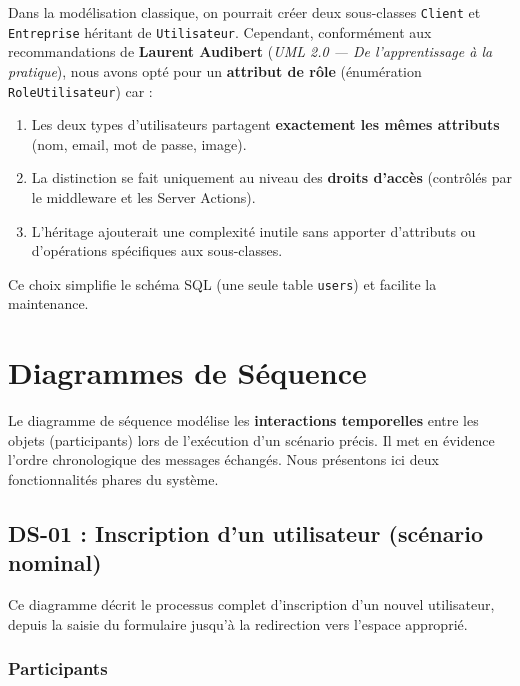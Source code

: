 \documentclass[12pt,a4paper]{article}
\begin{document}
\begin{tcolorbox}[colback=green!3!white,colframe=green!50!black,title=Choix de conception]
Dans la modélisation classique, on pourrait créer deux sous-classes \texttt{Client} et \texttt{Entreprise} héritant de \texttt{Utilisateur}. Cependant, conformément aux recommandations de \textbf{Laurent Audibert} (\textit{UML 2.0 — De l'apprentissage à la pratique}), nous avons opté pour un \textbf{attribut de rôle} (énumération \texttt{RoleUtilisateur}) car :
\begin{enumerate}
    \item Les deux types d'utilisateurs partagent \textbf{exactement les mêmes attributs} (nom, email, mot de passe, image).
    \item La distinction se fait uniquement au niveau des \textbf{droits d'accès} (contrôlés par le middleware et les Server Actions).
    \item L'héritage ajouterait une complexité inutile sans apporter d'attributs ou d'opérations spécifiques aux sous-classes.
\end{enumerate}
Ce choix simplifie le schéma SQL (une seule table \texttt{users}) et facilite la maintenance.
\end{tcolorbox}

\newpage
\section{Diagrammes de Séquence}

Le diagramme de séquence modélise les \textbf{interactions temporelles} entre les objets (participants) lors de l'exécution d'un scénario précis. Il met en évidence l'ordre chronologique des messages échangés. Nous présentons ici deux fonctionnalités phares du système.

\subsection{DS-01 : Inscription d'un utilisateur (scénario nominal)}

Ce diagramme décrit le processus complet d'inscription d'un nouvel utilisateur, depuis la saisie du formulaire jusqu'à la redirection vers l'espace approprié.

\subsubsection{Participants}
\end{document}
